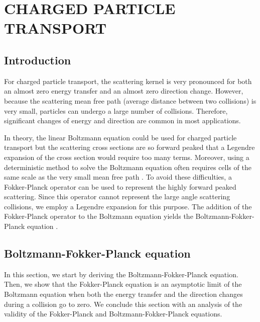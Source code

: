\chapter{\uppercase{Charged particle transport}} \label{cp_transport_chapter}
\section{Introduction}
For charged particle transport, the scattering kernel is very pronounced 
for both an almost zero energy transfer and an almost zero direction 
change. However, because the
scattering mean free path (average distance between two collisions) is very
small, particles can undergo a large number of collisions. Therefore,
significant changes of energy and direction are common in most applications.

In theory, the linear Boltzmann equation could be used for charged particle
transport but the scattering cross sections are so forward peaked that a Legendre 
expansion of the cross section would require too many terms. 
Moreover, using a deterministic method to solve the Boltzmann equation often 
requires cells of the same scale as the very small mean free path \cite{pomraning}. 
To avoid these difficulties, a Fokker-Planck operator can
be used to represent the highly forward peaked scattering. Since this operator 
cannot represent the large angle scattering collisions, we employ a Legendre
expansion for this purpose. The addition of the Fokker-Planck operator to the 
Boltzmann equation yields the Boltzmann-Fokker-Planck equation \cite{ligou}.

\section{Boltzmann-Fokker-Planck equation}
In this section, we start by deriving the Boltzmann-Fokker-Planck equation.
Then, we show that the Fokker-Planck equation is an asymptotic limit of the 
Boltzmann equation when both the energy transfer and the direction changes 
during a collision go to zero. We conclude this section with an analysis of 
the validity of the Fokker-Planck and Boltzmann-Fokker-Planck equations.
